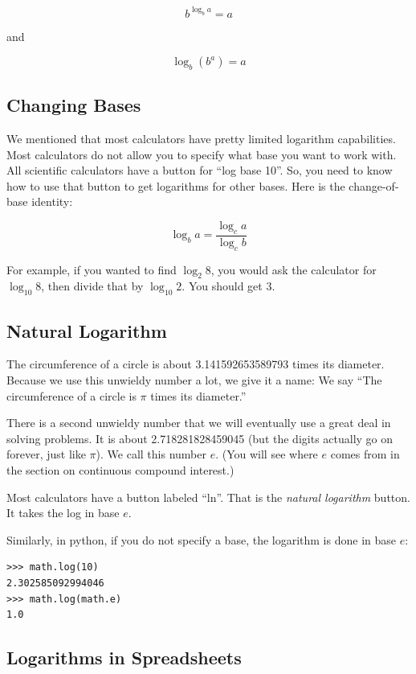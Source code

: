 $$b^{\log_b a} = a$$

and

$$\log_b \left(b^a\right) = a$$

\subsection{Changing Bases}

We mentioned that most calculators have pretty limited logarithm
capabilities. Most calculators do not allow you to specify what base
you want to work with. All scientific calculators have a button for
``log base 10''.  So, you need to know how to use that button to get
logarithms for other bases. Here is the change-of-base identity:

$$\log_b a = \frac {\log_c a}{\log_c b}$$

For example, if you wanted to find $\log_2 8$, you would ask the
calculator for $\log_{10} 8$, then divide that by $\log_{10} 2$.
You should get 3.

\subsection{Natural Logarithm}

The circumference of a circle is about 3.141592653589793 times its
diameter.  Because we use
this unwieldy number a lot, we give it a name: We say ``The
circumference of a circle is $\pi$ times its diameter.''

There is a second unwieldy number that we will eventually use a great deal in
solving problems. It is about 2.718281828459045 (but the digits
actually go on forever, just like $\pi$). We call this number $e$. (You will see where $e$ comes from in the section on continuous compound
interest.)

Most calculators have a button labeled ``ln''. That is the
\textit{natural logarithm} button. It takes the log in base $e$.

Similarly, in python, if you do not specify a base, the logarithm is done in base $e$:

\begin{verbatim}
>>> math.log(10)
2.302585092994046
>>> math.log(math.e)
1.0
\end{verbatim}

\subsection{Logarithms in Spreadsheets}

